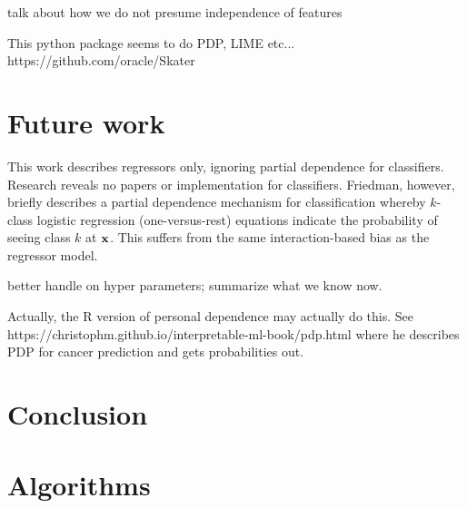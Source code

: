 \documentclass[12pt]{article}
\begin{document}
talk about how we do not presume independence of features
 
This python package seems to do PDP, LIME etc... https://github.com/oracle/Skater

\section{Future work}

This work describes regressors only, ignoring partial dependence for classifiers.  Research reveals no papers or implementation for classifiers. Friedman, however, briefly describes a partial dependence mechanism for classification whereby $k$-class logistic regression (one-versus-rest) equations indicate the probability of seeing class $k$ at $\bf{x}$.  This suffers from the same interaction-based bias as the regressor model.

better handle on hyper parameters; summarize what we know now.

Actually, the R version of personal dependence may actually do this. See https://christophm.github.io/interpretable-ml-book/pdp.html where he describes PDP for cancer prediction and gets probabilities out.

\section{Conclusion}
\label{sec:conc}

\section{Algorithms}
\end{document}
